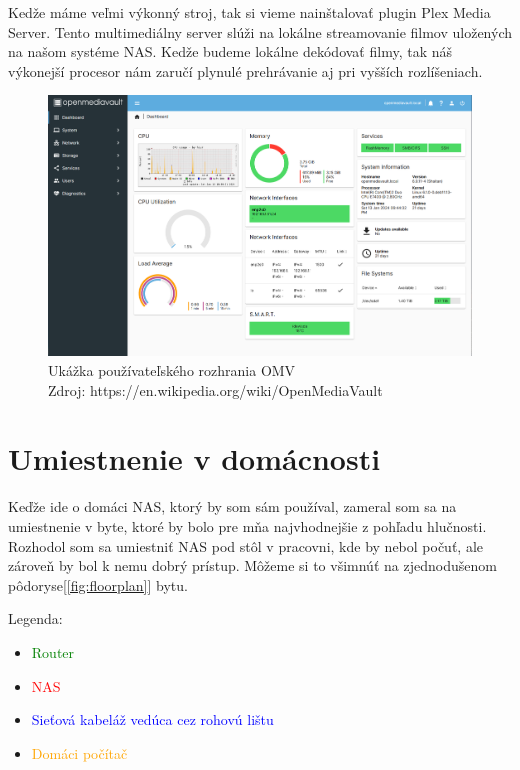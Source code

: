 \documentclass[12pt,oneside,slovak,a4paper]{article}
\begin{document}
Kedže máme veľmi výkonný stroj, tak si vieme nainštalovať plugin Plex Media Server. Tento multimediálny server slúži na lokálne streamovanie filmov uložených na našom systéme NAS. Kedže budeme lokálne dekódovať filmy, tak náš výkonejší procesor nám zaručí plynulé prehrávanie aj pri vyšších rozlíšeniach.

\begin{figure}[H]
	\centering
	\captionsetup{justification=centering,margin=2cm}
	\includegraphics[width=\linewidth]{./images/OMV6_dashboard.png} %
	\centering
	\caption{Ukážka používateľského rozhrania OMV \\ Zdroj: https://en.wikipedia.org/wiki/OpenMediaVault}
\end{figure}

\section{Umiestnenie v domácnosti}
Keďže ide o domáci NAS, ktorý by som sám používal, zameral som sa na umiestnenie v byte, ktoré by bolo pre mňa najvhodnejšie z pohľadu hlučnosti. Rozhodol som sa umiestniť NAS pod stôl v pracovni, kde by nebol počuť, ale zároveň by bol k nemu dobrý prístup. Môžeme si to všimnúť na zjednodušenom pôdoryse[\ref{fig:floorplan}] bytu.

Legenda:
\begin{spacing}{1.0}
\begin{itemize}
	\item \textcolor{green}{Router}
	\item \textcolor{red}{NAS}
	\item \textcolor{blue}{Sieťová kabeláž vedúca cez rohovú lištu}
	\item \textcolor{orange}{Domáci počítač}
\end{itemize}
\end{spacing}
\end{document}
